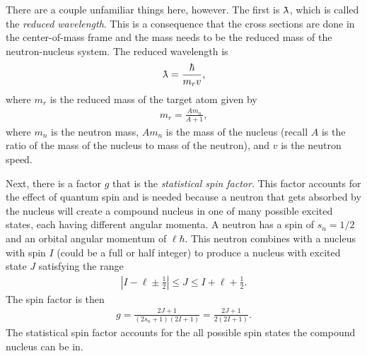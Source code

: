 There are a couple unfamiliar things here, however. The first is $\lambdabar$, which is called the \emph{reduced wavelength}. This is a consequence that the cross sections are done in the center-of-mass frame and the mass needs to be the reduced mass of the neutron-nucleus system. The reduced wavelength is
\begin{align}
  \lambdabar = \frac{ \hbar }{ m_r v },
\end{align}
where $m_r$ is the reduced mass of the target atom given by
\begin{align} \label{Eq:nuclearData_reducedMass}
  m_r = \frac{ A m_n }{ A + 1 } ,
\end{align}
where $m_n$ is the neutron mass, $A m_n$ is the mass of the nucleus (recall $A$ is the ratio of the mass of the nucleus to mass of the neutron), and $v$ is the neutron speed.

Next, there is a factor $g$ that is the \emph{statistical spin factor}. This factor accounts for the effect of quantum spin and is needed because a neutron that gets absorbed by the nucleus will create a compound nucleus in one of many possible excited states, each having different angular momenta. A neutron has a spin of $s_n = 1/2$ and an orbital angular momentum of $\ell \hbar$. This neutron combines with a nucleus with spin $I$ (could be a full or half integer) to produce a nucleus with excited state $J$ satisfying the range
\begin{align}
  | I - \ell \pm \frac{1}{2} | \le J \le I + \ell + \frac{1}{2} .
\end{align}
The spin factor is then
\begin{align}
  g = \frac{ 2J + 1 }{ ( 2s_n + 1 ) ( 2I + 1 ) } = \frac{ 2J + 1 }{ 2 ( 2 I + 1 ) }.
\end{align}
The statistical spin factor accounts for the all possible spin states the compound nucleus can be in.

